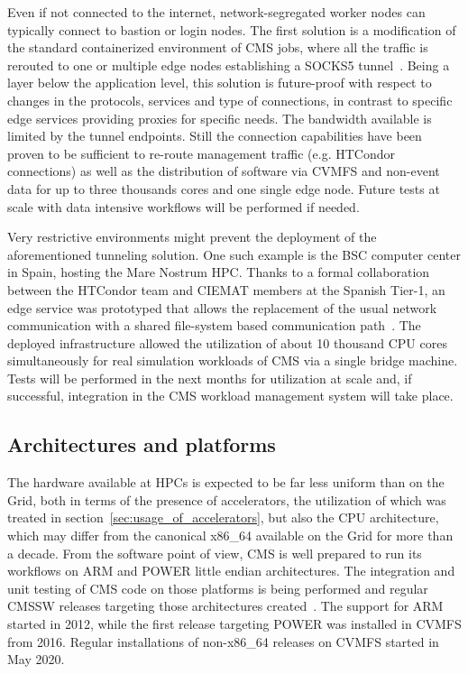 \documentclass{cmspaper}
\begin{document}
Even if not connected to the internet, network-segregated worker nodes can typically connect to bastion or login nodes. The first solution is a modification of the standard containerized environment of CMS jobs, where all the traffic is rerouted to one or multiple edge nodes establishing a SOCKS5 tunnel~\cite{tsocksigsc}. Being a layer below the application level, this solution is future-proof with respect to changes in the protocols, services and type of connections, in contrast to specific edge services providing proxies for specific needs. The bandwidth available is limited by the tunnel endpoints. Still the connection capabilities have been proven to be sufficient to re-route management traffic (e.g. HTCondor connections) as well as the distribution of software via CVMFS and non-event data for up to three thousands cores and one single edge node. Future tests at scale with data intensive workflows will be performed if needed.

Very restrictive environments might prevent the deployment of the aforementioned tunneling solution. One such example is the BSC computer center in Spain, hosting the Mare Nostrum HPC. Thanks to a formal collaboration between the HTCondor team and CIEMAT members at the Spanish Tier-1, an edge service was prototyped that allows the replacement of the usual network communication with a shared file-system based communication path~\cite{AntonioD}. The deployed infrastructure allowed the utilization of about 10 thousand CPU cores simultaneously for real simulation workloads of CMS via a single bridge machine. Tests will be performed in the next months for utilization at scale and, if successful, integration in the CMS workload management system will take place.

\subsection{Architectures and platforms}
The hardware available at HPCs is expected to be far less uniform than on the Grid, both in terms of the presence of accelerators, the utilization of which was treated in section~\ref{sec:usage_of_accelerators}, but also the CPU architecture, which may differ from the canonical x86\_64 available on the Grid for more than a decade. From the software point of view, CMS is well prepared to run its workflows on ARM and POWER little endian architectures. The integration and unit testing of CMS code on those platforms is being performed and regular CMSSW releases targeting those architectures created~\cite{ModernizingTheCMSSoftwareStack}. The support for ARM started in 2012, while the first release targeting POWER was installed in CVMFS from 2016. Regular installations of non-x86\_64 releases on CVMFS started in May 2020.
\end{document}
